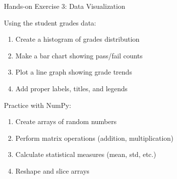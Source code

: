 \begin{frame}{Hands-on Exercise 3: Data Visualization}
    \begin{exercise}
        Using the student grades data:
        \begin{enumerate}
            \item Create a histogram of grades distribution
            \item Make a bar chart showing pass/fail counts
            \item Plot a line graph showing grade trends
            \item Add proper labels, titles, and legends
        \end{enumerate}
    \end{exercise}
    
    \begin{exercise}
        Practice with NumPy:
        \begin{enumerate}
            \item Create arrays of random numbers
            \item Perform matrix operations (addition, multiplication)
            \item Calculate statistical measures (mean, std, etc.)
            \item Reshape and slice arrays
        \end{enumerate}
    \end{exercise}
\end{frame}
